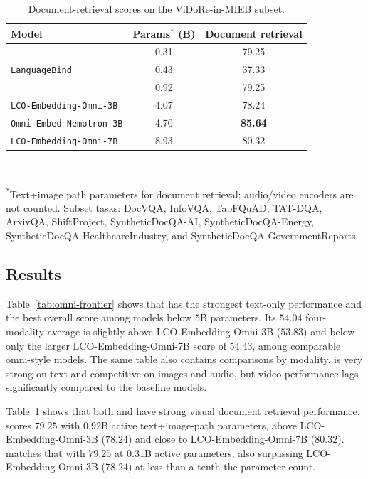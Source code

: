 \begin{table}[th]
  \caption{Document-retrieval scores on the ViDoRe-in-MIEB subset.}
  \label{tab:omni-doc-retrieval}
  \centering
  \small
  \setlength{\tabcolsep}{3pt}
  \begin{tabular}{@{}lcc@{}}
    \toprule
    Model & Params$^{*}$ (B) & Document retrieval \\
    \midrule
    \omniNano{} & 0.31 & 79.25 \\
    \texttt{LanguageBind} & 0.43 & 37.33 \\
    \omniSmall{} & 0.92 & 79.25 \\
    \texttt{LCO-Embedding-Omni-3B} & 4.07 & 78.24 \\
    \texttt{Omni-Embed-Nemotron-3B} & 4.70 & \textbf{85.64} \\
    \texttt{LCO-Embedding-Omni-7B} & 8.93 & 80.32 \\
    \bottomrule
  \end{tabular}
  \\[0.4em]
  \begin{minipage}{0.97\columnwidth}
  \footnotesize
  \textsuperscript{*}Text+image path parameters for document retrieval; audio/video encoders are not counted.
  Subset tasks: DocVQA, InfoVQA, TabFQuAD, TAT-DQA, ArxivQA, ShiftProject, SyntheticDocQA-AI, SyntheticDocQA-Energy, SyntheticDocQA-HealthcareIndustry, and SyntheticDocQA-GovernmentReports.
  \end{minipage}
\end{table}

\subsection{Results}
\label{sec:experiments:summary}

Table~\ref{tab:omni-frontier} shows that \omniSmall{} has the strongest text-only performance and the best overall score among models below $5$B parameters.
Its $54.04$ four-modality average is slightly above LCO-Embedding-Omni-3B ($53.83$) and below only the larger LCO-Embedding-Omni-7B score of $54.43$, among comparable omni-style models.
The same table also contains comparisons by modality. \omniSmall{} is very strong on text and competitive on images and audio, but video performance lags significantly compared to the baseline models.

Table~\ref{tab:omni-doc-retrieval} shows that both \omniNano{} and \omniSmall{} have strong visual document retrieval performance.
\omniSmall{} scores $79.25$ with $0.92$B active text+image-path parameters, above LCO-Embedding-Omni-3B ($78.24$) and close to LCO-Embedding-Omni-7B ($80.32$).
\omniNano{} matches that with $79.25$ at $0.31$B active parameters, also surpassing LCO-Embedding-Omni-3B ($78.24$) at less than a tenth the parameter count.

